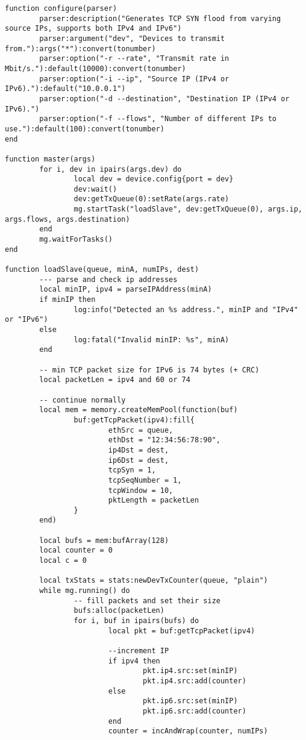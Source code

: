 \begin{landscape}
\begin{verbatim}
function configure(parser)
        parser:description("Generates TCP SYN flood from varying source IPs, supports both IPv4 and IPv6")
        parser:argument("dev", "Devices to transmit from."):args("*"):convert(tonumber)
        parser:option("-r --rate", "Transmit rate in Mbit/s."):default(10000):convert(tonumber)
        parser:option("-i --ip", "Source IP (IPv4 or IPv6)."):default("10.0.0.1")
        parser:option("-d --destination", "Destination IP (IPv4 or IPv6).")
        parser:option("-f --flows", "Number of different IPs to use."):default(100):convert(tonumber)
end

function master(args)
        for i, dev in ipairs(args.dev) do
                local dev = device.config{port = dev}
                dev:wait()
                dev:getTxQueue(0):setRate(args.rate)
                mg.startTask("loadSlave", dev:getTxQueue(0), args.ip, args.flows, args.destination)
        end
        mg.waitForTasks()
end

function loadSlave(queue, minA, numIPs, dest)
        --- parse and check ip addresses
        local minIP, ipv4 = parseIPAddress(minA)
        if minIP then
                log:info("Detected an %s address.", minIP and "IPv4" or "IPv6")
        else
                log:fatal("Invalid minIP: %s", minA)
        end

        -- min TCP packet size for IPv6 is 74 bytes (+ CRC)
        local packetLen = ipv4 and 60 or 74

        -- continue normally
        local mem = memory.createMemPool(function(buf)
                buf:getTcpPacket(ipv4):fill{
                        ethSrc = queue,
                        ethDst = "12:34:56:78:90",
                        ip4Dst = dest,
                        ip6Dst = dest,
                        tcpSyn = 1,
                        tcpSeqNumber = 1,
                        tcpWindow = 10,
                        pktLength = packetLen
                }
        end)

        local bufs = mem:bufArray(128)
        local counter = 0
        local c = 0

        local txStats = stats:newDevTxCounter(queue, "plain")
        while mg.running() do
                -- fill packets and set their size 
                bufs:alloc(packetLen)
                for i, buf in ipairs(bufs) do
                        local pkt = buf:getTcpPacket(ipv4)

                        --increment IP
                        if ipv4 then
                                pkt.ip4.src:set(minIP)
                                pkt.ip4.src:add(counter)
                        else
                                pkt.ip6.src:set(minIP)
                                pkt.ip6.src:add(counter)
                        end
                        counter = incAndWrap(counter, numIPs)


\end{verbatim}
\end{landscape}
